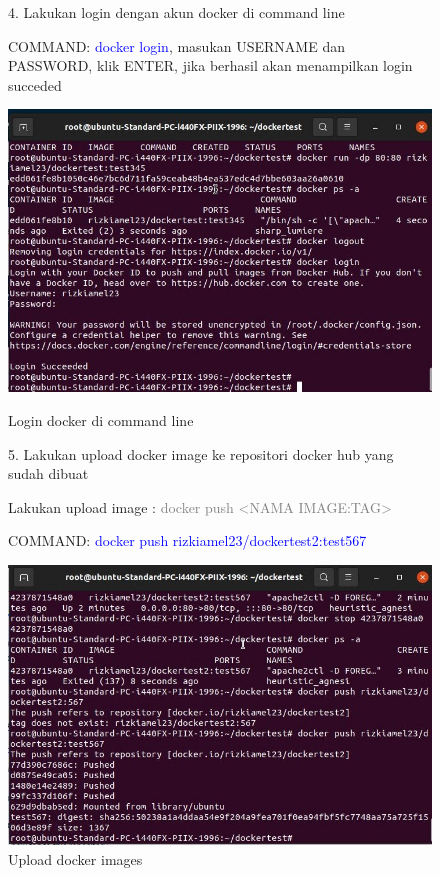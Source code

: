 \begin{figure}
    4. Lakukan login dengan akun docker di command line

    COMMAND: \textcolor{Blue}{docker login}, masukan USERNAME dan PASSWORD, klik ENTER, jika berhasil akan menampilkan login succeded
        \begin{center}
            \includegraphics[width=\linewidth]{image/30.jpg}
            \caption{Login docker di command line}
            \label{fig:my_figure}
        \end{center}
    5. Lakukan upload docker image ke repositori docker hub yang sudah dibuat
    
    Lakukan upload image : \textcolor{Gray}{docker push <NAMA IMAGE:TAG>}
        
    COMMAND: \textcolor{Blue}{docker push rizkiamel23/dockertest2:test567}
        \begin{center}
            \includegraphics[width=\linewidth]{image/32.jpg}
            \caption{Upload docker images}
            \label{fig:my_figure}
        \end{center}
\end{figure}
    
